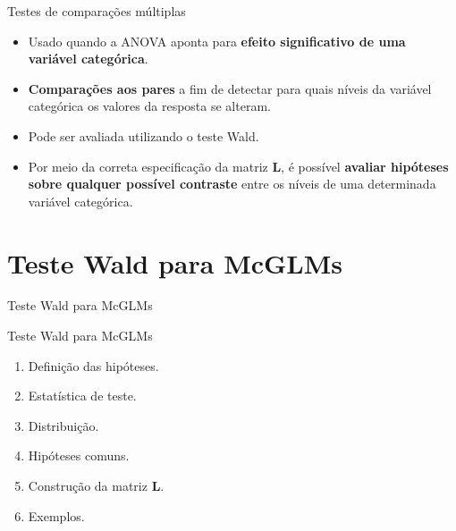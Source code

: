 \documentclass[
  ignorenonframetext,
  serif,
  professionalfont,
  usenames,
  dvipsnames,
  aspectratio = 169]{beamer}
\begin{document}
\begin{frame}{Testes de comparações múltiplas}
\protect\hypertarget{testes-de-comparauxe7uxf5es-muxfaltiplas}{}
\begin{itemize}

  \itemsep 2ex

  \item Usado quando a ANOVA aponta para \textbf{efeito significativo de uma variável categórica}.

  \item \textbf{Comparações aos pares} a fim de detectar para quais níveis da variável categórica os valores da resposta se alteram.

  \item Pode ser avaliada utilizando o teste Wald. 

  \item Por meio da correta especificação da matriz $\boldsymbol{L}$, é possível \textbf{avaliar hipóteses sobre qualquer possível contraste} entre os níveis de uma determinada variável categórica. 

\end{itemize}
\end{frame}

\hypertarget{teste-wald-para-mcglms}{%
\section{Teste Wald para McGLMs}\label{teste-wald-para-mcglms}}

\begin{frame}{Teste Wald para McGLMs}
\end{frame}

\begin{frame}{Teste Wald para McGLMs}
\protect\hypertarget{teste-wald-para-mcglms-1}{}
\begin{enumerate}
  \itemsep 2ex
    
  \item Definição das hipóteses.
  \item Estatística de teste.
  \item Distribuição.
  \item Hipóteses comuns.
  \item Construção da matriz $\boldsymbol{L}$.
  \item Exemplos.
  
\end{enumerate}
\end{frame}
\end{document}
